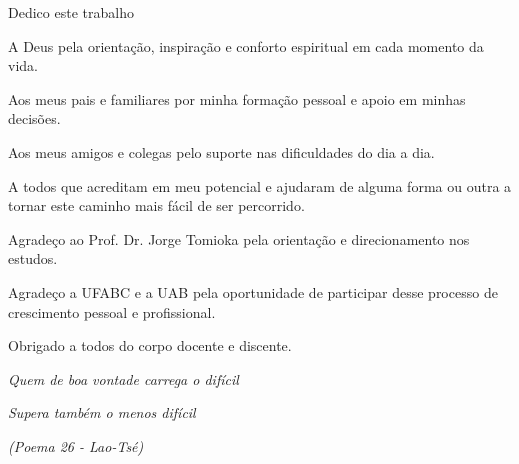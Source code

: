 \documentclass[
    12pt,               %
    openright,          %
    oneside,            %
    a4paper,            %
    chapter=TITLE,      %
    sumario=tradicional,
    english,            %
    french,             %
    spanish,            %
    brazil              %
]{abntex2}
\renewcommand{\imprimircapa}{
    \begin{capa}
        
    \end{capa}
}
\begin{document}
\frenchspacing %

\pretextual
\imprimircapa
\imprimirfolhaderosto



\begin{dedicatoria}
    \vspace*{1 cm}
    Dedico este trabalho
    \newline

    A Deus pela orientação, inspiração e conforto espiritual em cada momento da
    vida.
    \newline

    Aos meus pais e familiares por minha formação pessoal e apoio em minhas
    decisões.
    \newline
    
    Aos meus amigos e colegas pelo suporte nas dificuldades do dia a dia.
    \newline
    
    A todos que acreditam em meu potencial e ajudaram de alguma forma ou outra
    a tornar este caminho mais fácil de ser percorrido.

    \vspace*{\fill}
\end{dedicatoria}

\begin{agradecimentos}
	\vspace*{1 cm}
    Agradeço ao Prof. Dr. Jorge Tomioka pela orientação e direcionamento nos
    estudos.
    \newline
    
    Agradeço a UFABC e a UAB pela oportunidade de participar desse processo de
    crescimento pessoal e profissional.

    Obrigado a todos do corpo docente e discente.
    \vspace*{\fill}
\end{agradecimentos}

\begin{epigrafe}
    \vspace*{\fill}
    \begin{flushright}
        \textit{Quem de boa vontade carrega o difícil}
        
        \textit{Supera também o menos difícil}
        
        \textit{(Poema 26 - Lao-Tsé)}
    \end{flushright}
\end{epigrafe}
\end{document}
